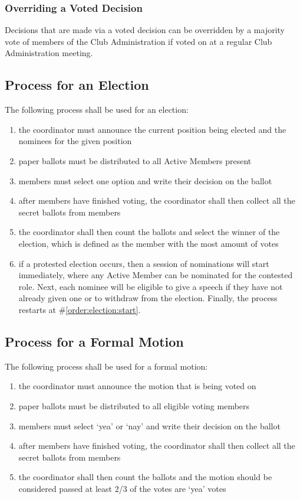 \documentclass[english,11pt]{article}
\begin{document}
\subsubsection{Overriding a Voted Decision} \label{subsect:decision:voted:override}
Decisions that are made via a voted decision can be overridden by a majority vote of members of the Club Administration if voted on at a regular Club Administration meeting.

\subsection{Process for an Election} \label{sect:decision:election}
The following process shall be used for an election:

\begin{enumerate}
    \item \label{order:election:start} the coordinator must announce the current position being elected and the nominees for the given position
    \item paper ballots must be distributed to all Active Members present
    \item members must select one option and write their decision on the ballot
    \item after members have finished voting, the coordinator shall then collect all the secret ballots from members
    \item the coordinator shall then count the ballots and select the winner of the election, which is defined as the member with the most amount of votes
    \item \label{order:election:protested} if a protested election occurs, then a session of nominations will start immediately, where any Active Member can be nominated for the contested role.
        Next, each nominee will be eligible to give a speech if they have not already given one or to withdraw from the election.
        Finally, the process restarts at \#\ref{order:election:start}.
\end{enumerate}

\subsection{Process for a Formal Motion} \label{sect:decision:formal-motion}
The following process shall be used for a formal motion:

\begin{enumerate}
    \item the coordinator must announce the motion that is being voted on
    \item paper ballots must be distributed to all eligible voting members
    \item members must select `yea' or `nay' and write their decision on the ballot
    \item after members have finished voting, the coordinator shall then collect all the secret ballots from members
    \item the coordinator shall then count the ballots and the motion should be considered passed at least 2/3 of the votes are `yea' votes
\end{enumerate}
\end{document}
